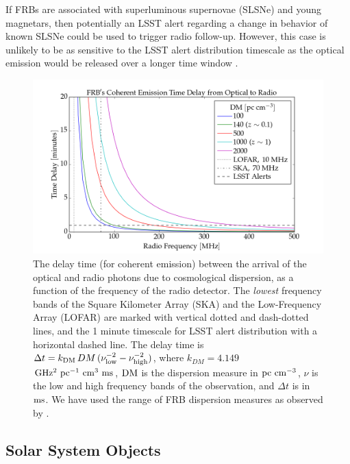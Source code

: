 \documentclass[DM,lsstdraft,authoryear,toc]{lsstdoc}
\begin{document}
If FRBs are associated with superluminous supernovae (SLSNe) and young magnetars, then potentially an LSST alert regarding a change in behavior of known SLSNe could be used to trigger radio follow-up.
However, this case is unlikely to be as sensitive to the LSST alert distribution timescale as the optical emission would be released over a longer time window \citep{2019arXiv191002036L}.

\begin{figure}[h]
\begin{center}
\includegraphics[width=15cm]{figures/frb_optical_delays.png}
\caption{The delay time (for coherent emission) between the arrival of the optical and radio photons due to cosmological dispersion, as a function of the frequency of the radio detector. The {\it lowest} frequency bands of the Square Kilometer Array (SKA) and the Low-Frequency Array (LOFAR) are marked with vertical dotted and dash-dotted lines, and the 1 minute timescale for LSST alert distribution with a horizontal dashed line. The delay time is $\Delta t = k_{\rm DM}\,DM\,(\nu_{\rm low}^{-2} - \nu_{\rm high}^{-2})$, where $k_{DM}=4.149$ $\rm GHz^2\ pc^{-1}\ cm^3\ ms$, ${\rm DM}$ is the dispersion measure in $\rm pc\ cm^{-3}$, $\nu$ is the low and high frequency bands of the observation, and $\Delta t$ is in $\rm ms$. We have used the range of FRB dispersion measures as observed by \cite{2018Natur.562..386S}. \label{fig:sci_frb}}
\end{center}
\end{figure}

\subsection{Solar System Objects}\label{ssec:latency_sso}
\end{document}
